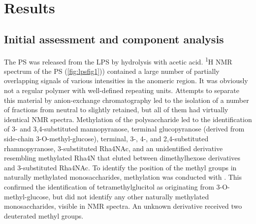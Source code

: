 \section{Results} %
\label{sec:results}

	\subsection{Initial assessment and component analysis} %
	\label{sub:initial_assessment_and_component_analysis}

		The \ac{PS} was released from the \ac{LPS} by hydrolysis with acetic acid. \textsuperscript{1}H \ac{NMR} spectrum of the \ac{PS} (\cref{fig:lpsfig1})) contained a large number of partially overlapping signals of various intensities in the anomeric region. It was obviously not a regular polymer with well-defined repeating units. Attempts to separate this material by anion-exchange chromatography led to the isolation of a number of fractions from neutral to slightly retained, but all of them had virtually identical \ac{NMR} spectra. Methylation of the polysaccharide led to the identification of 3- and 3,4-substituted mannopyranose, terminal glucopyranose (derived from side-chain 3-O-methyl-glucose), terminal, 3-, 4-, and 2,4-substituted rhamnopyranose, 3-substituted Rha4NAc, and an unidentified derivative resembling methylated Rha4N that eluted between dimethylhexose derivatives and 3-substituted Rha4NAc. To identify the position of the methyl groups in naturally methylated monosaccharides, methylation was conducted with . This confirmed the identification of tetramethylglucitol as originating from 3-O-methyl-glucose, but did not identify any other naturally methylated monosaccharides, visible in \ac{NMR} spectra. An unknown derivative received two deuterated methyl groups.


